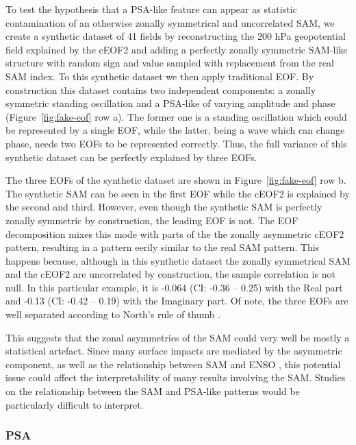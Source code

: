 \documentclass[smallextended]{svjour3}       %
\begin{document}
To test the hypothesis that a PSA-like feature can appear as statistic contamination of an otherwise zonally symmetrical and uncorrelated SAM, we create a synthetic dataset of 41 fields by reconstructing the 200 hPa geopotential field explained by the cEOF2 and adding a perfectly zonally symmetric SAM-like structure with random sign and value sampled with replacement from the real SAM index. To this synthetic dataset we then apply traditional EOF. By construction this dataset contains two independent components: a zonally symmetric standing oscillation and a PSA-like of varying amplitude and phase (Figure~\ref{fig:fake-eof} row a). The former one is a standing oscillation which could be represented by a single EOF, while the latter, being a wave which can change phase, needs two EOFs to be represented correctly. Thus, the full variance of this synthetic dataset can be perfectly explained by three EOFs.

The three EOFs of the synthetic dataset are shown in Figure~\ref{fig:fake-eof} row b. The synthetic SAM can be seen in the first EOF while the cEOF2 is explained by the second and third. However, even though the synthetic SAM is perfectly zonally symmetric by construction, the leading EOF is not. The EOF decomposition mixes this mode with parts of the the zonally asymmetric cEOF2 pattern, resulting in a pattern eerily similar to the real SAM pattern. This happens because, although in this synthetic dataset the zonally symmetrical SAM and the cEOF2 are uncorrelated by construction, the sample correlation is not null. In this particular example, it is -0.064 (CI: -0.36 -- 0.25) with the Real part and -0.13 (CI: -0.42 -- 0.19) with the Imaginary part. Of note, the three EOFs are well separated according to North's rule of thumb \citep{north1982}.

This suggests that the zonal asymmetries of the SAM could very well be mostly a statistical artefact. Since many surface impacts are mediated by the asymmetric component, as well as the relationship between SAM and ENSO \citep{campitelli2021}, this potential issue could affect the interpretability of many results involving the SAM. Studies on the relationship between the SAM and PSA-like patterns would be particularly difficult to interpret.

\hypertarget{psa}{%
\subsubsection{PSA}\label{psa}}
\end{document}
